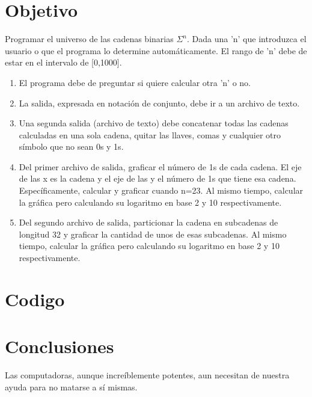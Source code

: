 \documentclass{article}
\begin{document}
	\section{Objetivo}
	Programar el universo de las cadenas binarias \( \Sigma^n \). Dada una 'n' que introduzca el usuario o que el programa lo determine automáticamente. El rango de 'n' debe de estar en el intervalo de [0,1000].
\begin{enumerate}
	\item  El programa debe de preguntar si quiere calcular otra 'n' o no.
	\item La salida, expresada en notación de conjunto, debe ir a un archivo de texto.
	\item Una segunda salida (archivo de texto) debe concatenar todas las cadenas calculadas en una sola cadena, quitar las llaves, comas y cualquier otro símbolo que no sean 0s y 1s.
	\item Del primer archivo de salida, graficar el número de 1s de cada cadena. El eje de las x es la cadena y el eje de las y el número de 1s que tiene esa cadena. Específicamente, calcular y graficar cuando n=23. Al mismo tiempo, calcular la gráfica pero calculando su logaritmo en base 2 y 10 respectivamente.
	\item Del segundo archivo de salida, particionar la cadena en subcadenas de longitud 32 y graficar la cantidad de unos de esas subcadenas. Al mismo tiempo, calcular la gráfica pero calculando su logaritmo en base 2 y 10 respectivamente.
\end{enumerate}
	
	\section{Codigo}
	
	\section{Conclusiones}
	Las computadoras, aunque increíblemente potentes, aun necesitan de nuestra ayuda para no matarse a sí mismas.
\end{document}
